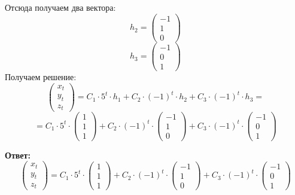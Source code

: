 \documentclass[a4paper,12pt]{article}
\begin{document}
Отсюда получаем два вектора:
\[
h_2= \begin{pmatrix}
-1 \\ 1 \\ 0
\end{pmatrix}
\]
\[
h_3 = \begin{pmatrix}
-1 \\ 0 \\ 1
\end{pmatrix}
\]
Получаем решение:
\[
\begin{pmatrix}
x_{t } \\
y_{t} \\
z_{t } 
\end{pmatrix} = C_1 \cdot 5^t \cdot h_1 + C_2 \cdot (-1)^t \cdot h_2 + C_3 \cdot (-1)^t \cdot h_3 = 
\]
\[
=
C_1 \cdot 5^t \cdot \begin{pmatrix}
1 \\ 1 \\ 1
\end{pmatrix} + C_2 \cdot (-1)^t \cdot  \begin{pmatrix}
-1 \\ 1 \\ 0
\end{pmatrix} + C_3 \cdot (-1)^t \cdot  \begin{pmatrix}
-1 \\ 0 \\ 1
\end{pmatrix}
\]
\begin{center}
\textbf{Ответ: } 
\[
\begin{pmatrix}
x_{t } \\
y_{t} \\
z_{t } 
\end{pmatrix} 
=
C_1 \cdot 5^t \cdot \begin{pmatrix}
1 \\ 1 \\ 1
\end{pmatrix} + C_2 \cdot (-1)^t \cdot  \begin{pmatrix}
-1 \\ 1 \\ 0
\end{pmatrix} + C_3 \cdot (-1)^t \cdot  \begin{pmatrix}
-1 \\ 0 \\ 1
\end{pmatrix}
\]
\end{center}
\clearpage
\end{document}
